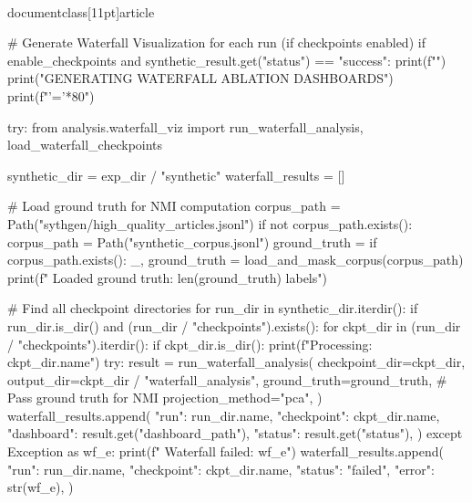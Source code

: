 \\documentclass[11pt]{article}
\begin{document}
\begin{CodeBlock}
        # Generate Waterfall Visualization for each run (if checkpoints enabled)
        if enable_checkpoints and synthetic_result.get("status") == "success":
            print(f"")
            print("GENERATING WATERFALL ABLATION DASHBOARDS")
            print(f"{'='*80}")

            try:
                from analysis.waterfall_viz import run_waterfall_analysis, load_waterfall_checkpoints

                synthetic_dir = exp_dir / "synthetic"
                waterfall_results = []

                # Load ground truth for NMI computation
                corpus_path = Path("sythgen/high_quality_articles.jsonl")
                if not corpus_path.exists():
                    corpus_path = Path("synthetic_corpus.jsonl")
                ground_truth = {}
                if corpus_path.exists():
                    _, ground_truth = load_and_mask_corpus(corpus_path)
                    print(f"  Loaded ground truth: {len(ground_truth)} labels")

                # Find all checkpoint directories
                for run_dir in synthetic_dir.iterdir():
                    if run_dir.is_dir() and (run_dir / "checkpoints").exists():
                        for ckpt_dir in (run_dir / "checkpoints").iterdir():
                            if ckpt_dir.is_dir():
                                print(f"\n  Processing: {ckpt_dir.name}")
                                try:
                                    result = run_waterfall_analysis(
                                        checkpoint_dir=ckpt_dir,
                                        output_dir=ckpt_dir / "waterfall_analysis",
                                        ground_truth=ground_truth,  # Pass ground truth for NMI
                                        projection_method="pca",
                                    )
                                    waterfall_results.append({
                                        "run": run_dir.name,
                                        "checkpoint": ckpt_dir.name,
                                        "dashboard": result.get("dashboard_path"),
                                        "status": result.get("status"),
                                    })
                                except Exception as wf_e:
                                    print(f"    Waterfall failed: {wf_e}")
                                    waterfall_results.append({
                                        "run": run_dir.name,
                                        "checkpoint": ckpt_dir.name,
                                        "status": "failed",
                                        "error": str(wf_e),
                                    })


\end{CodeBlock}
\end{document}
